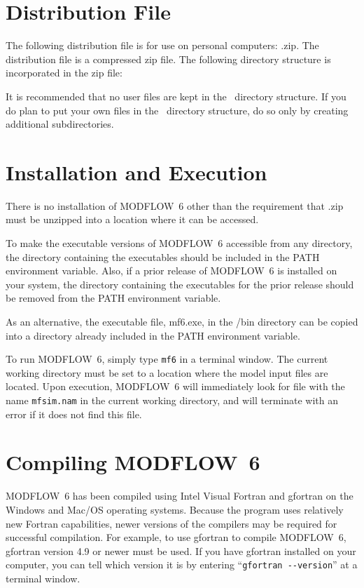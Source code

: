 \documentclass[11pt,twoside,twocolumn]{usgsreport}
\begin{document}
\section{Distribution File}
The following distribution file is for use on personal computers: \modflowversion.zip.  The distribution file is a compressed zip file. The following directory structure is incorporated in the zip file:



It is recommended that no user files are kept in the \modflowversion~directory structure.  If you do plan to put your own files in the \modflowversion~directory structure, do so only by creating additional subdirectories.

\section{Installation and Execution}
There is no installation of MODFLOW~6 other than the requirement that \modflowversion.zip must be unzipped into a location where it can be accessed.  

To make the executable versions of MODFLOW~6 accessible from any directory, the directory containing the executables should be included in the PATH environment variable.  Also, if a prior release of MODFLOW~6 is installed on your system, the directory containing the executables for the prior release should be removed from the PATH environment variable.

As an alternative, the executable file, mf6.exe, in the \modflowversion{}/bin directory can be copied into a directory already included in the PATH environment variable.

To run MODFLOW~6, simply type \texttt{mf6} in a terminal window.  The current working directory must be set to a location where the model input files are located.  Upon execution, MODFLOW~6 will immediately look for file with the name \texttt{mfsim.nam} in the current working directory, and will terminate with an error if it does not find this file.

\section{Compiling MODFLOW~6}
MODFLOW~6 has been compiled using Intel Visual Fortran and gfortran on the Windows and Mac/OS operating systems.  Because the program uses relatively new Fortran capabilities, newer versions of the compilers may be required for successful compilation.  For example, to use gfortran to compile MODFLOW~6, gfortran version 4.9 or newer must be used.  If you have gfortran installed on your computer, you can tell which version it is by entering ``\verb|gfortran --version|'' at a terminal window.
\end{document}
